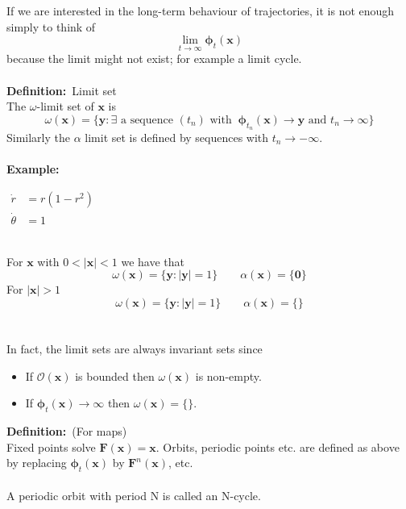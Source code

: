 \documentclass{article}
\newcommand{\cO}{\mathcal{O}}                               %
\newcommand{\example}{\textbf{Example:}}                    %
\newcommand{\definition}{\textbf{Definition:}}              %
\newcommand{\bp}{\bm{\phi}}                                 %
\begin{document}
\noindent If we are interested in the long-term behaviour of trajectories, it is not 
enough simply to think of 
\[ \lim_{t \to \infty} \bp_t(\bm{x}) \]
because the limit might not exist; for example a limit cycle.
\\
\\
\definition\ Limit set
\\
The $\omega$-limit set of $\bm{x}$ is 
\[ \omega (\bm{x}) = \{ \bm{y} : \exists \mbox{ a sequence } (t_n) \mbox{ with }\
 \bp_{t_n}(\bm{x}) \to \bm{y} \mbox{ and } t_n \to \infty \} \]
Similarly the $\alpha$ limit set is defined by sequences with $t_n \to - \infty$.
\\
\\
\example\ \\
\begin{minipage}[c][0.22\textwidth][c]{0.2\textwidth}
\end{minipage}
\hspace{0.2\textwidth}
\begin{minipage}[c][0.22\textwidth][c]{0.3\textwidth}
\begin{center}
\end{center}
\end{minipage}
%
\begin{minipage}[c][0.22\textwidth][c]{0.3\textwidth}
\begin{center}
$ \begin{array}{rl}
\dot{r} &= r(1-r^2) \\
\dot{\theta} &= 1
\end{array}$
\end{center}
\end{minipage}
\\
%
For $\bm{x}$ with $0 < |\bm{x}| < 1$ we have that
\[ \omega ( \bm{x} ) = \{ \bm{y} : |\bm{y}| = 1 \}  \qquad  \alpha ( \bm{x} ) = \{\bm{0} \} \]
For $|\bm{x}|>1$
\[ \omega ( \bm{x} ) = \{ \bm{y} : |\bm{y}| = 1 \}  \qquad  \alpha ( \bm{x} ) = \{ \} \]
\\
\\
In fact, the limit sets are always invariant sets since
\begin{itemize}
\item If $\cO(\bm{x})$ is bounded then $\omega(\bm{x})$ is non-empty.
\item If $\bp_t(\bm{x}) \to \infty$ then $\omega(\bm{x}) = \{ \} $.
\end{itemize}\vspace{3mm}
\definition\ (For maps) 
\\
Fixed points solve $\bm{F}(\bm{x}) = \bm{x}$. Orbits, periodic points etc.
are defined as above by replacing $\bp_t(\bm{x})$ by $\bm{F}^n(\bm{x})$,
etc.
\\
\\
A periodic orbit with period N is called an N-cycle.
\end{document}
